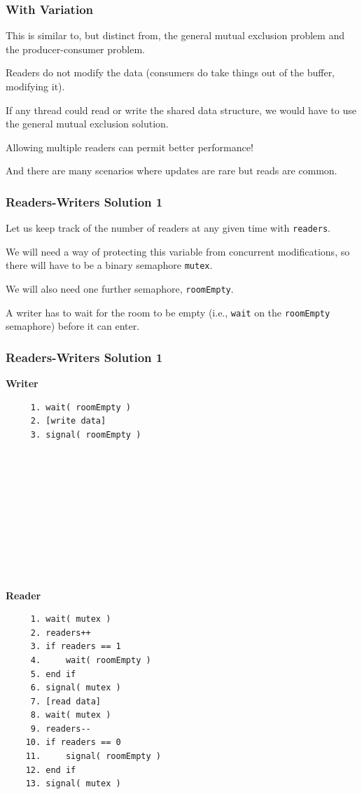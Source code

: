 \begin{frame}
\frametitle{With Variation}

This is similar to, but distinct from, the general mutual exclusion problem and the producer-consumer problem. 

Readers do not modify the data (consumers do take things out of the buffer, modifying it).

If any thread could read or write the shared data structure, we would have to use the general mutual exclusion solution.

Allowing multiple readers can permit better performance!

And there are many scenarios where updates are rare but reads are common.

\end{frame}

\begin{frame}
\frametitle{Readers-Writers Solution 1}
Let us keep track of the number of readers at any given time with \texttt{readers}. 

We will need a way of protecting this variable from concurrent modifications, so there will have to be a binary semaphore \texttt{mutex}. 

We will also need one further semaphore, \texttt{roomEmpty}.

A writer has to wait for the room to be empty (i.e., \texttt{wait} on the \texttt{roomEmpty} semaphore) before it can enter.
\end{frame}



\begin{frame}[fragile]
\frametitle{Readers-Writers Solution 1}

\begin{multicols}{2}
\textbf{Writer}
  \begin{verbatim}
	 1. wait( roomEmpty )
	 2. [write data]
	 3. signal( roomEmpty )
	 
	 
	 
	 
	 
	 
	 
	 
	 
	 
  \end{verbatim}
\columnbreak
\textbf{Reader}
  \begin{verbatim}
	 1. wait( mutex )
	 2. readers++
	 3. if readers == 1
	 4.     wait( roomEmpty )
	 5. end if
	 6. signal( mutex )
	 7. [read data]
	 8. wait( mutex )
	 9. readers--
	10. if readers == 0
	11.     signal( roomEmpty )
	12. end if
	13. signal( mutex )
  \end{verbatim}
\end{multicols}
\vspace{-2em}

\end{frame}

